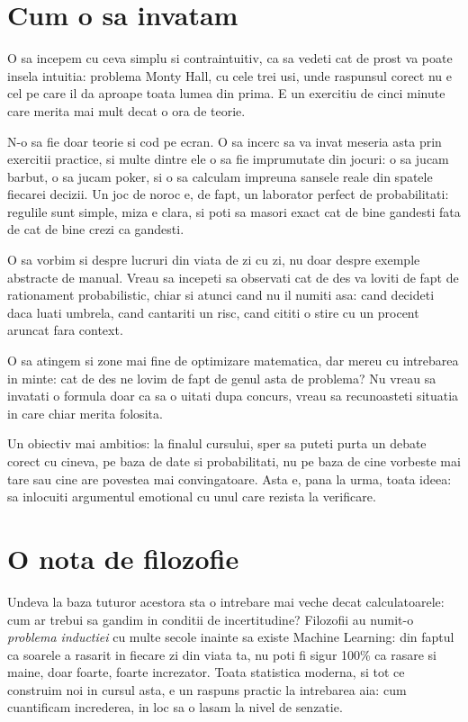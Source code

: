 \section*{Cum o sa invatam}

O sa incepem cu ceva simplu si contraintuitiv, ca sa vedeti cat de prost
va poate insela intuitia: problema Monty Hall, cu cele trei usi, unde
raspunsul corect nu e cel pe care il da aproape toata lumea din prima. E
un exercitiu de cinci minute care merita mai mult decat o ora de teorie.

N-o sa fie doar teorie si cod pe ecran. O sa incerc sa va invat meseria
asta prin exercitii practice, si multe dintre ele o sa fie imprumutate
din jocuri: o sa jucam barbut, o sa jucam poker, si o sa calculam
impreuna sansele reale din spatele fiecarei decizii. Un joc de noroc e,
de fapt, un laborator perfect de probabilitati: regulile sunt simple,
miza e clara, si poti sa masori exact cat de bine gandesti fata de cat de
bine crezi ca gandesti.

O sa vorbim si despre lucruri din viata de zi cu zi, nu doar despre
exemple abstracte de manual. Vreau sa incepeti sa observati cat de des va
loviti de fapt de rationament probabilistic, chiar si atunci cand nu il
numiti asa: cand decideti daca luati umbrela, cand cantariti un risc, cand
cititi o stire cu un procent aruncat fara context.

O sa atingem si zone mai fine de optimizare matematica, dar mereu cu
intrebarea in minte: cat de des ne lovim de fapt de genul asta de
problema? Nu vreau sa invatati o formula doar ca sa o uitati dupa
concurs, vreau sa recunoasteti situatia in care chiar merita folosita.

Un obiectiv mai ambitios: la finalul cursului, sper sa puteti purta un
debate corect cu cineva, pe baza de date si probabilitati, nu pe baza de
cine vorbeste mai tare sau cine are povestea mai convingatoare. Asta e,
pana la urma, toata ideea: sa inlocuiti argumentul emotional cu unul care
rezista la verificare.

\section*{O nota de filozofie}

Undeva la baza tuturor acestora sta o intrebare mai veche decat
calculatoarele: cum ar trebui sa gandim in conditii de incertitudine?
Filozofii au numit-o \textit{problema inductiei} cu multe secole inainte
sa existe Machine Learning: din faptul ca soarele a rasarit in fiecare zi
din viata ta, nu poti fi sigur 100\% ca rasare si maine, doar foarte,
foarte increzator. Toata statistica moderna, si tot ce construim noi in
cursul asta, e un raspuns practic la intrebarea aia: cum cuantificam
increderea, in loc sa o lasam la nivel de senzatie.

